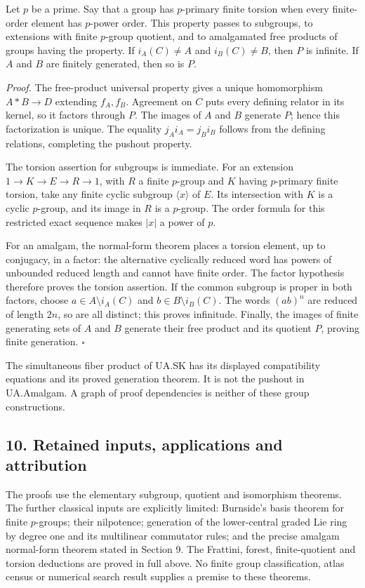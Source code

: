 \documentclass[
  11pt,
  a4paper,
]{article}
\begin{document}
Let \(p\) be a prime. Say that a group has \(p\)-primary finite torsion
when every finite-order element has \(p\)-power order. This property
passes to subgroups, to extensions with finite \(p\)-group quotient, and
to amalgamated free products of groups having the property. If
\(i_A(C)\ne A\) and \(i_B(C)\ne B\), then \(P\) is infinite. If \(A\)
and \(B\) are finitely generated, then so is \(P\).

\emph{Proof.} The free-product universal property gives a unique
homomorphism \(A*B\to D\) extending \(f_A,f_B\). Agreement on \(C\) puts
every defining relator in its kernel, so it factors through \(P\). The
images of \(A\) and \(B\) generate \(P\); hence this factorization is
unique. The equality \(j_Ai_A=j_Bi_B\) follows from the defining
relations, completing the pushout property.

The torsion assertion for subgroups is immediate. For an extension
\(1\to K\to E\to R\to1\), with \(R\) a finite \(p\)-group and \(K\)
having \(p\)-primary finite torsion, take any finite cyclic subgroup
\(\langle x\rangle\) of \(E\). Its intersection with \(K\) is a cyclic
\(p\)-group, and its image in \(R\) is a \(p\)-group. The order formula
for this restricted exact sequence makes \(|x|\) a power of \(p\).

For an amalgam, the normal-form theorem places a torsion element, up to
conjugacy, in a factor: the alternative cyclically reduced word has
powers of unbounded reduced length and cannot have finite order. The
factor hypothesis therefore proves the torsion assertion. If the common
subgroup is proper in both factors, choose \(a\in A\setminus i_A(C)\)
and \(b\in B\setminus i_B(C)\). The words \((ab)^n\) are reduced of
length \(2n\), so are all distinct; this proves infinitude. Finally, the
images of finite generating sets of \(A\) and \(B\) generate their free
product and its quotient \(P\), proving finite generation. \(\square\)

The simultaneous fiber product of UA.SK has its displayed compatibility
equations and its proved generation theorem. It is not the pushout in
UA.Amalgam. A graph of proof dependencies is neither of these group
constructions.

\subsection{10. Retained inputs, applications and
attribution}\label{retained-inputs-applications-and-attribution}

The proofs use the elementary subgroup, quotient and isomorphism
theorems. The further classical inputs are explicitly limited:
Burnside's basis theorem for finite \(p\)-groups; their nilpotence;
generation of the lower-central graded Lie ring by degree one and its
multilinear commutator rules; and the precise amalgam normal-form
theorem stated in Section 9. The Frattini, forest, finite-quotient and
torsion deductions are proved in full above. No finite group
classification, atlas census or numerical search result supplies a
premise to these theorems.
\end{document}
